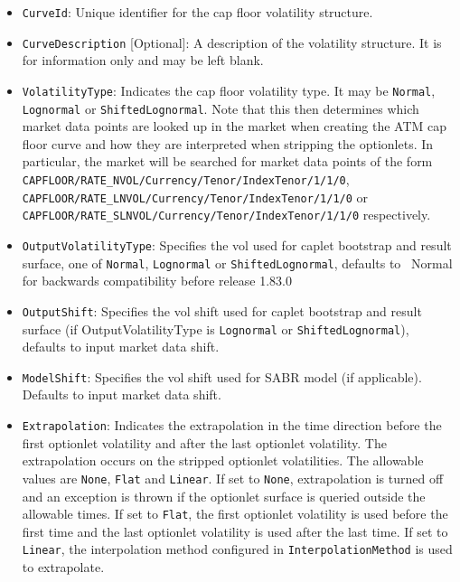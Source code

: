 \begin{itemize}
\item
\lstinline!CurveId!: Unique identifier for the cap floor volatility structure.

\item \lstinline!CurveDescription! [Optional]:
A description of the volatility structure. It is for information only and may be left blank.

\item \lstinline!VolatilityType!:
Indicates the cap floor volatility type. It may be \lstinline!Normal!, \lstinline!Lognormal! or \lstinline!ShiftedLognormal!. Note that this then determines which market data points are looked up in the market when creating the ATM cap floor curve and how they are interpreted when stripping the optionlets. In particular, the market will be searched for market data points of the form \lstinline!CAPFLOOR/RATE_NVOL/Currency/Tenor/IndexTenor/1/1/0!, \lstinline!CAPFLOOR/RATE_LNVOL/Currency/Tenor/IndexTenor/1/1/0! or \lstinline!CAPFLOOR/RATE_SLNVOL/Currency/Tenor/IndexTenor/1/1/0! respectively.

\item \lstinline!OutputVolatilityType!: Specifies the vol used for caplet bootstrap and result surface, one of {\tt Normal},
  {\tt Lognormal} or {\tt ShiftedLognormal}, defaults to {\ Normal} for backwards compatibility before release 1.83.0

\item \lstinline!OutputShift!: Specifies the vol shift used for caplet bootstrap and result surface (if OutputVolatilityType is
{\tt Lognormal} or {\tt ShiftedLognormal}), defaults to input market data shift.

\item \lstinline!ModelShift!: Specifies the vol shift used for SABR model (if applicable). Defaults to input market data shift.

\item \lstinline!Extrapolation!:
Indicates the extrapolation in the time direction before the first optionlet volatility and after the last optionlet volatility. The extrapolation occurs on the stripped optionlet volatilities. The allowable values are \lstinline!None!, \lstinline!Flat! and \lstinline!Linear!. If set to \lstinline!None!, extrapolation is turned off and an exception is thrown if the optionlet surface is queried outside the allowable times. If set to \lstinline!Flat!, the first optionlet volatility is used before the first time and the last optionlet volatility is used after the last time. If set to \lstinline!Linear!, the interpolation method configured in \lstinline!InterpolationMethod! is used to extrapolate.


\end{itemize}

